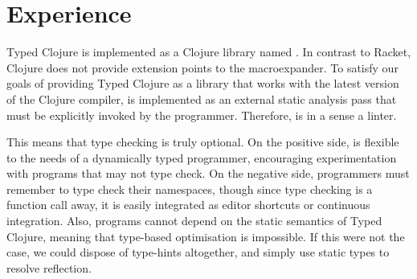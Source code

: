\section{Experience}
\label{sec:experience}

Typed Clojure is implemented as a Clojure library named \coretyped{}.
In contrast to Racket, Clojure does not provide extension
points to the macroexpander. To satisfy our goals of providing
Typed Clojure as a library that works with the latest version of the Clojure
compiler, \coretyped{} is implemented as an external static analysis pass
that must be explicitly invoked by the programmer.
Therefore, \coretyped{} is in a sense a linter.

This means that type checking is truly optional. 
On the positive side, \coretyped{} is flexible to the needs of a dynamically
typed programmer, encouraging experimentation with programs that may not
type check.
On the negative side, programmers must remember to type check their namespaces,
though since type checking is a function call away, it is easily integrated as editor
shortcuts or continuous integration.
Also, programs cannot depend on the static semantics of Typed Clojure, meaning that
type-based optimisation is impossible. If this were not the case, we could dispose of type-hints
altogether, and simply use static types to resolve reflection.

%
%


